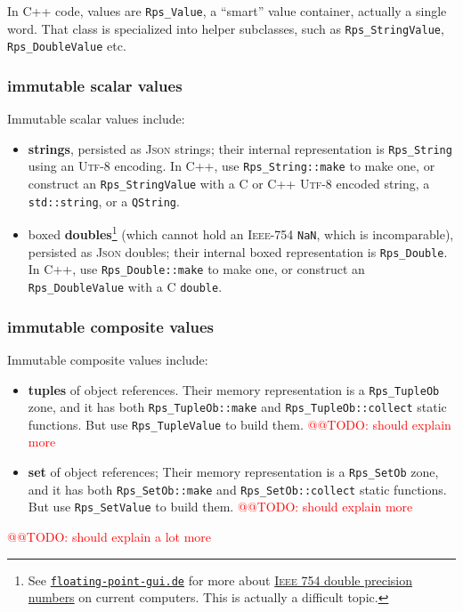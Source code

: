 \documentclass[11pt,a4paper,svgnames]{article}
\begin{document}
In C++ code, values are \texttt{Rps\_Value}, a ``smart'' value
container, actually a single word. That class is specialized into
helper subclasses, such as \texttt{Rps\_StringValue},
\texttt{Rps\_DoubleValue} etc.

\subsubsection{immutable scalar values}
\label{subsubsec:immutable-scalar}

Immutable scalar values include:
\begin{itemize}
  \item \textbf{strings},  persisted as \textsc{Json} strings; their internal
    representation is \texttt{Rps\_String} using an \textsc{Utf-8}
    encoding. In C++, use \texttt{Rps\_String::make} to make one, or
    construct an \texttt{Rps\_StringValue} with a C or C++ \textsc{Utf-8} encoded
    string, a \texttt{std::string}, or a \texttt{QString}.
    \item boxed \textbf{doubles}\footnote{See
    \href{http://floating-point-gui.de}{\texttt{floating-point-gui.de}}
      for more about
      \href{https://en.wikipedia.org/wiki/IEEE\_754}{\textsc{Ieee 754}
        double precision numbers} on current computers. This is
      actually a difficult topic.} (which cannot hold an
    \textsc{Ieee-754} \texttt{NaN}, which is incomparable), persisted
    as \textsc{Json} doubles; their internal boxed representation is
    \texttt{Rps\_Double}. In C++, use \texttt{Rps\_Double::make} to make one, or
    construct an \texttt{Rps\_DoubleValue} with a C \texttt{double}.
\end{itemize}

\subsubsection{immutable composite values}
\label{subsubsec:immutable-composite}

Immutable composite values include:
\begin{itemize}
\item \textbf{tuples} of object references. Their memory
  representation is a \texttt{Rps\_TupleOb} zone, and it has both
  \texttt{Rps\_TupleOb::make} and \texttt{Rps\_TupleOb::collect} static functions. But use
  \texttt{Rps\_TupleValue} to build them. \textcolor{red}{@@TODO:
    should explain more}
\item \textbf{set} of object references; Their memory
  representation is a \texttt{Rps\_SetOb} zone, and it has both
  \texttt{Rps\_SetOb::make} and \texttt{Rps\_SetOb::collect} static functions. But use
  \texttt{Rps\_SetValue} to build them.  \textcolor{red}{@@TODO: should explain more}
\end{itemize}
\textcolor{red}{@@TODO: should explain a lot more}
\end{document}
